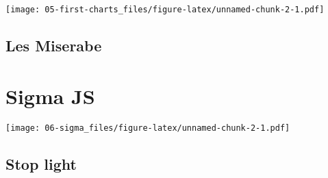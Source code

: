 \documentclass[]{book}
\newenvironment{Shaded}{\begin{snugshade}}{\end{snugshade}}
\newcommand{\CommentTok}[1]{\textcolor[rgb]{0.56,0.35,0.01}{\textit{#1}}}
\newcommand{\KeywordTok}[1]{\textcolor[rgb]{0.13,0.29,0.53}{\textbf{#1}}}
\newcommand{\NormalTok}[1]{#1}
\newcommand{\OperatorTok}[1]{\textcolor[rgb]{0.81,0.36,0.00}{\textbf{#1}}}
\newcommand{\StringTok}[1]{\textcolor[rgb]{0.31,0.60,0.02}{#1}}
\begin{document}
\texttt{[image: 05-first-charts\_files/figure-latex/unnamed-chunk-2-1.pdf]}

\hypertarget{les-miserabe}{%
\section{Les Miserabe}\label{les-miserabe}}

\hypertarget{sigma}{%
\chapter{Sigma JS}\label{sigma}}

\begin{Shaded}
\end{Shaded}

\texttt{[image: 06-sigma\_files/figure-latex/unnamed-chunk-2-1.pdf]}

\hypertarget{stop-light-1}{%
\section{Stop light}\label{stop-light-1}}
\end{document}

